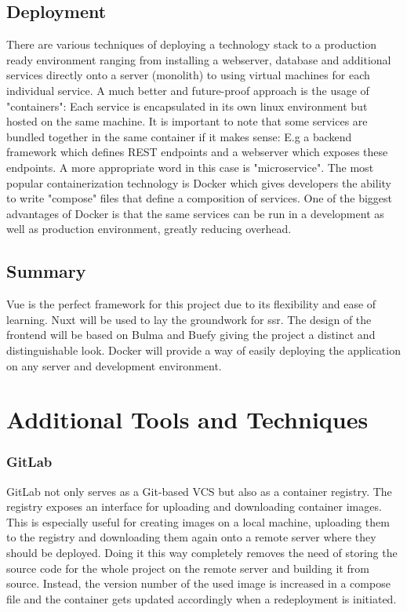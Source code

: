 \subsection{Deployment}
There are various techniques of deploying a technology stack to a production ready environment ranging from installing a webserver, database and additional services directly onto a server (monolith) to using virtual machines for each individual service. A much better and future-proof approach is the usage of "containers": Each service is encapsulated in its own linux environment but hosted on the same machine. It is important to note that some services are bundled together in the same container if it makes sense: E.g a backend framework which defines REST endpoints and a webserver which exposes these endpoints. A more appropriate word in this case is "microservice". The most popular containerization technology is Docker which gives developers the ability to write "compose" files that define a composition of services. One of the biggest advantages of Docker is that the same services can be run in a development as well as production environment, greatly reducing overhead.

\subsection{Summary}
Vue is the perfect framework for this project due to its flexibility and ease of learning. Nuxt will be used to lay the groundwork for \acrshort{ssr}. The design of the frontend will be based on Bulma and Buefy giving the project a distinct and distinguishable look. Docker will provide a way of easily deploying the application on any server and development environment.

\section{Additional Tools and Techniques}
\subsubsection{GitLab}
GitLab not only serves as a Git-based VCS but also as a container registry. The registry exposes an interface for uploading and downloading container images. This is especially useful for creating images on a local machine, uploading them to the registry and downloading them again onto a remote server where they should be deployed. Doing it this way completely removes the need of storing the source code for the whole project on the remote server and building it from source. Instead, the version number of the used image is increased in a compose file and the container gets updated accordingly when a redeployment is initiated.

